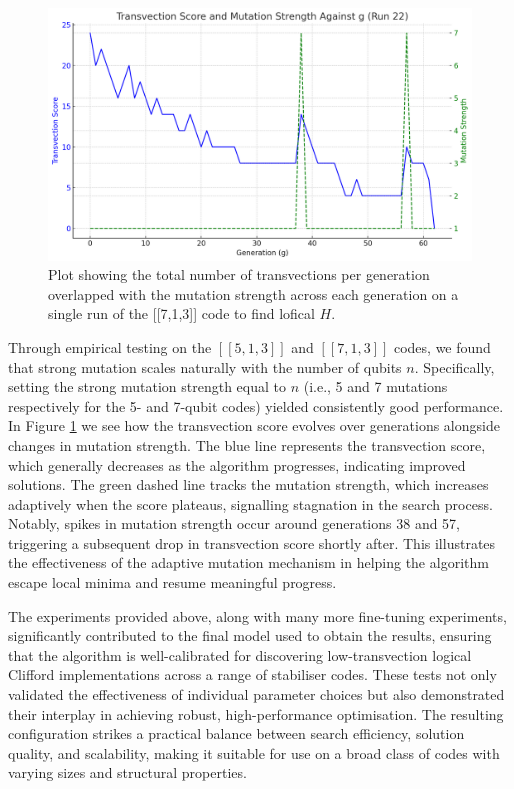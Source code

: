 \begin{figure}[h]
    \centering
    \includegraphics[width=1\linewidth]{Logos/output-4.png}
    \caption{Plot showing the total number of transvections per generation overlapped with the mutation strength across each generation on a single run of the [[7,1,3]] code to find lofical \(H\).}
    \label{fig: Adaptive Mutation tracker}
\end{figure}

Through empirical testing on the \([[5,1,3]]\) and \([[7,1,3]]\) codes, we found that strong mutation scales naturally with the number of qubits \(n\). Specifically, setting the strong mutation strength equal to \(n\) (i.e., 5 and 7 mutations respectively for the 5- and 7-qubit codes) yielded consistently good performance. In Figure \ref{fig: Adaptive Mutation tracker} we see how the transvection score evolves over generations alongside changes in mutation strength. The blue line represents the transvection score, which generally decreases as the algorithm progresses, indicating improved solutions. The green dashed line tracks the mutation strength, which increases adaptively when the score plateaus, signalling stagnation in the search process. Notably, spikes in mutation strength occur around generations 38 and 57, triggering a subsequent drop in transvection score shortly after. This illustrates the effectiveness of the adaptive mutation mechanism in helping the algorithm escape local minima and resume meaningful progress.

The experiments provided above, along with many more fine-tuning experiments, significantly contributed to the final model used to obtain the results, ensuring that the algorithm is well-calibrated for discovering low-transvection logical Clifford implementations across a range of stabiliser codes. These tests not only validated the effectiveness of individual parameter choices but also demonstrated their interplay in achieving robust, high-performance optimisation. The resulting configuration strikes a practical balance between search efficiency, solution quality, and scalability, making it suitable for use on a broad class of codes with varying sizes and structural properties.

